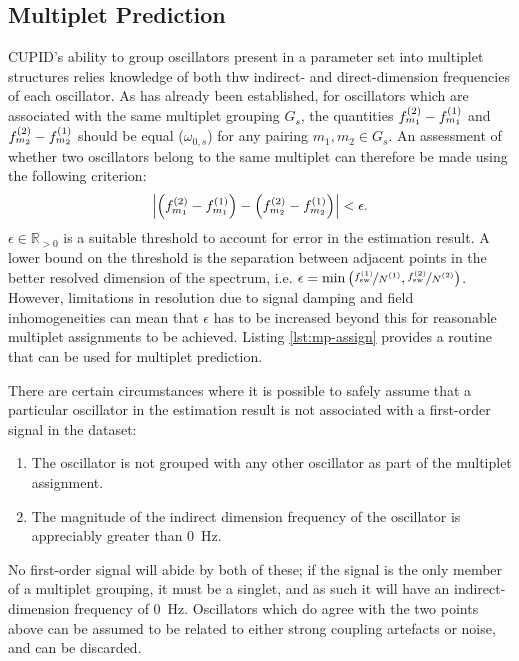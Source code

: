 \subsection{Multiplet Prediction}
\label{subsec:mp-selection}
\ac{CUPID}'s ability to group oscillators present in a parameter set into
multiplet structures relies knowledge of both thw indirect- and
direct-dimension frequencies of each oscillator. As has already been
established, for oscillators which are associated with the same multiplet
grouping $G_s$, the quantities $f^{(2)}_{m_1} - f^{(1)}_{m_1}$ and $f^{(2)}_{m_2} -
f^{(1)}_{m_2}$ should be equal ($\omega_{0,s}$) for any pairing  $m_1, m_2 \in
G_s$. An assessment of whether two oscillators belong to the same multiplet can
therefore be made using the following criterion:
\begin{equation}
    \left \lvert
        \left( f^{(2)}_{m_1} - f^{(1)}_{m_1} \right) -
        \left( f^{(2)}_{m_2} - f^{(1)}_{m_2} \right)
    \right \rvert < \epsilon.
\end{equation}
$\epsilon \in \mathbb{R}_{>0}$ is a suitable threshold to account for error in
the estimation result. A lower bound on the threshold is the separation between
adjacent points in the better resolved dimension of the spectrum, i.e.
$\epsilon = \min\left(\nicefrac{\fswone}{\None},
\nicefrac{\fswtwo}{\Ntwo}\right)$.  However, limitations in resolution due to
signal damping and field inhomogeneities can mean that $\epsilon$ has to be
increased beyond this for reasonable multiplet assignments to be achieved.
Listing \ref{lst:mp-assign} provides a \Python routine that can be used for multiplet
prediction.

There are certain circumstances where it is possible to safely assume that a
particular oscillator in the estimation result is not associated with a
first-order signal in the dataset:
\begin{enumerate}
    \item The oscillator is not grouped with any other oscillator as part of
        the multiplet assignment.
    \item The magnitude of the indirect dimension frequency of the oscillator
        is appreciably greater than \qty{0}{\hertz}.
\end{enumerate}
No first-order signal will abide by both of these; if the signal is the only
member of a multiplet grouping, it must be a singlet, and as such it will have
an indirect-dimension frequency of \qty{0}{\hertz}. Oscillators which do agree
with the two points above can be assumed to be related to either strong
coupling artefacts or noise, and can be discarded.

